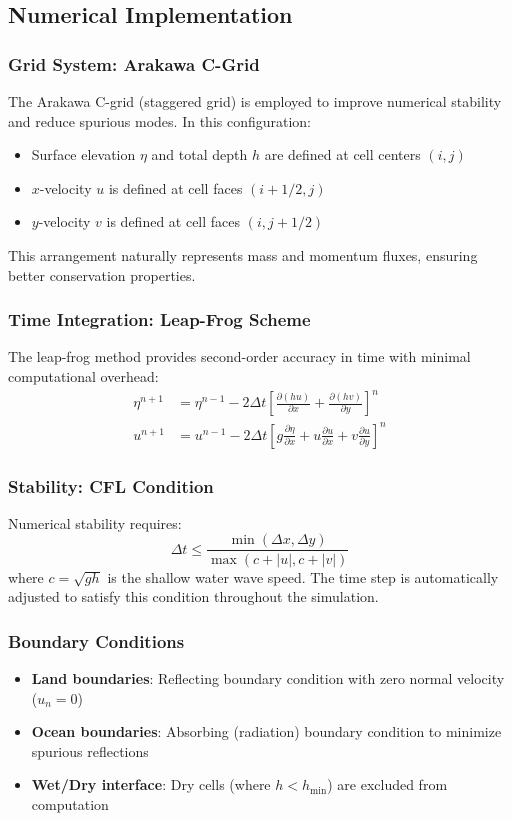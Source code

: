 \documentclass[12pt]{article}
\begin{document}
\subsection{Numerical Implementation}

\subsubsection{Grid System: Arakawa C-Grid}
The Arakawa C-grid (staggered grid) is employed to improve numerical stability and reduce spurious modes. In this configuration:
\begin{itemize}
    \item Surface elevation $\eta$ and total depth $h$ are defined at cell centers $(i, j)$
    \item $x$-velocity $u$ is defined at cell faces $(i+1/2, j)$
    \item $y$-velocity $v$ is defined at cell faces $(i, j+1/2)$
\end{itemize}

This arrangement naturally represents mass and momentum fluxes, ensuring better conservation properties.

\subsubsection{Time Integration: Leap-Frog Scheme}
The leap-frog method provides second-order accuracy in time with minimal computational overhead:
\begin{align}
\eta^{n+1} &= \eta^{n-1} - 2\Delta t \left[ \frac{\partial (hu)}{\partial x} + \frac{\partial (hv)}{\partial y} \right]^n \\
u^{n+1} &= u^{n-1} - 2\Delta t \left[ g\frac{\partial \eta}{\partial x} + u\frac{\partial u}{\partial x} + v\frac{\partial u}{\partial y} \right]^n
\end{align}

\subsubsection{Stability: CFL Condition}
Numerical stability requires:
\begin{equation}
\Delta t \leq \frac{\min(\Delta x, \Delta y)}{\max(c + |u|, c + |v|)}
\end{equation}
where $c = \sqrt{gh}$ is the shallow water wave speed. The time step is automatically adjusted to satisfy this condition throughout the simulation.

\subsubsection{Boundary Conditions}
\begin{itemize}
    \item \textbf{Land boundaries}: Reflecting boundary condition with zero normal velocity ($u_n = 0$)
    \item \textbf{Ocean boundaries}: Absorbing (radiation) boundary condition to minimize spurious reflections
    \item \textbf{Wet/Dry interface}: Dry cells (where $h < h_{\text{min}}$) are excluded from computation
\end{itemize}
\end{document}
